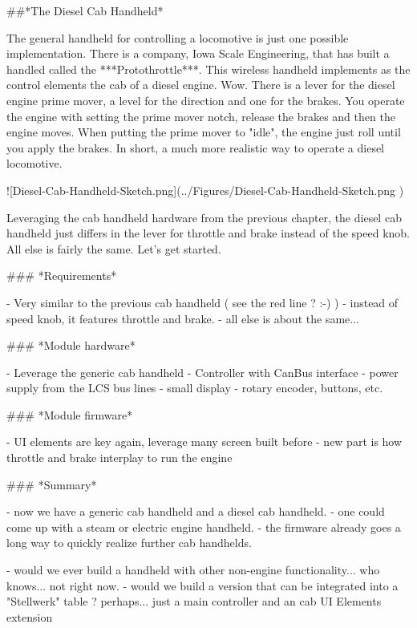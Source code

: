 ##*The Diesel Cab Handheld*

The general handheld for controlling a locomotive is just one possible implementation. There is a company, Iowa Scale Engineering, that has built a handled called the ***Protothrottle***. This wireless handheld implements as the control elements the cab of a diesel engine. Wow. There is a lever for the diesel engine prime mover, a level for the direction and one for the brakes. You operate the engine with setting the prime mover notch, release the brakes and then the engine moves. When putting the prime mover to "idle", the engine just roll until you apply the brakes. In short, a much more realistic way to operate a diesel locomotive.

![Diesel-Cab-Handheld-Sketch.png](../Figures/Diesel-Cab-Handheld-Sketch.png )

Leveraging the cab handheld hardware from the previous chapter, the diesel cab handheld just differs in the lever for throttle and brake instead of the speed knob. All else is fairly the same. Let's get started.

### *Requirements*

- Very similar to the previous cab handheld ( see the red line ? :-) )
- instead of speed knob, it features throttle and brake.
- all else is about the same...

### *Module hardware*

- Leverage the generic cab handheld
- Controller with CanBus interface
- power supply from the LCS bus lines
- small display
- rotary encoder, buttons, etc.

### *Module firmware*

- UI elements are key again, leverage many screen built before
- new part is how throttle and brake interplay to run the engine


### *Summary*

- now we have a generic cab handheld and a diesel cab handheld.
- one could come up with a steam or electric engine handheld. 
- the firmware already goes a long way to quickly realize further cab handhelds.

- would we ever build a handheld with other non-engine functionality... who knows... not right now.
- would we build a version that can be integrated into a "Stellwerk" table ? perhaps... just a main controller and an cab UI Elements extension
